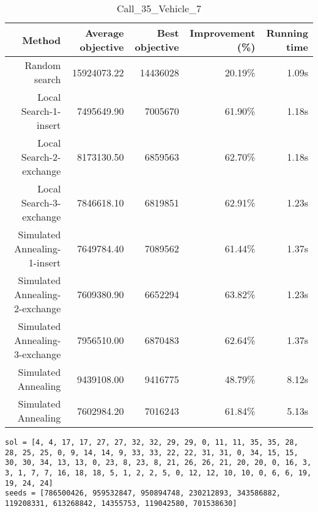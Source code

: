 \begin{table}[ht]
\centering
\caption{Call\_35\_Vehicle\_7}
\label{tab:call35vehicle7}
\begin{tabular}{|r|r|r|r|r|}
Method & Average objective & Best objective & Improvement (\%) & Running time \\
\hline
Random search & 15924073.22 & 14436028 & 20.19\% & 1.09s\\
Local Search-1-insert & 7495649.90 & 7005670 & 61.90\% & 1.18s\\
Local Search-2-exchange & 8173130.50 & 6859563 & 62.70\% & 1.18s\\
Local Search-3-exchange & 7846618.10 & 6819851 & 62.91\% & 1.23s\\
Simulated Annealing-1-insert & 7649784.40 & 7089562 & 61.44\% & 1.37s\\
Simulated Annealing-2-exchange & 7609380.90 & 6652294 & 63.82\% & 1.23s\\
Simulated Annealing-3-exchange & 7956510.00 & 6870483 & 62.64\% & 1.37s\\
Simulated Annealing & 9439108.00 & 9416775 & 48.79\% & 8.12s\\
Simulated Annealing & 7602984.20 & 7016243 & 61.84\% & 5.13s\\
\end{tabular}%
\end{table}
\begin{lstlisting}[label={lst:call35vehicle7},caption=Optimal solution call\_35\_vehicle\_7]
sol = [4, 4, 17, 17, 27, 27, 32, 32, 29, 29, 0, 11, 11, 35, 35, 28, 28, 25, 25, 0, 9, 14, 14, 9, 33, 33, 22, 22, 31, 31, 0, 34, 15, 15, 30, 30, 34, 13, 13, 0, 23, 8, 23, 8, 21, 26, 26, 21, 20, 20, 0, 16, 3, 3, 1, 7, 7, 16, 18, 18, 5, 1, 2, 2, 5, 0, 12, 12, 10, 10, 0, 6, 6, 19, 19, 24, 24]
seeds = [786500426, 959532847, 950894748, 230212893, 343586882, 119208331, 613268842, 14355753, 119042580, 701538630]
\end{lstlisting}%
\clearpage


